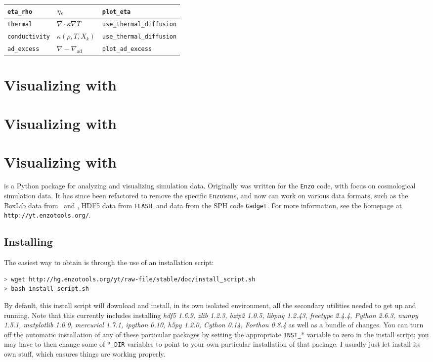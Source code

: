 \begin{center}
\begin{longtable}{|l|p{2.25in}|p{2.5in}|}
\hline
{\tt eta\_rho}         & $\eta_{\rho}$ & {\tt plot\_eta} \\
\hline
{\tt thermal}          & $\nabla \cdot \kappa \nabla T$ & {\tt use\_thermal\_diffusion} \\
\hline
{\tt conductivity}     & $\kappa(\rho, T, X_k)$ & {\tt use\_thermal\_diffusion} \\
\hline
{\tt ad\_excess}       & $\nabla - \nabla_\mathrm{ad}$ & {\tt plot\_ad\_excess} \\
\hline
\end{longtable}
\end{center}

\renewcommand{\arraystretch}{1.0}

\section{Visualizing with \amrvis}


\section{Visualizing with \visit}


\section{Visualizing with \yt}
\yt is a Python package for analyzing and visualizing simulation data.
Originally \yt was written for the {\tt Enzo} code, with focus on
cosmological simulation data.  It has since been refactored to remove
the specific {\tt Enzo}isms, and now can work on various data formats,
such as the BoxLib data from \maestro\ and \castro, HDF5 data
from {\tt FLASH}, and data from the SPH code {\tt Gadget}.  For more
information, see the \yt homepage at {\tt http://yt.enzotools.org/}.

\subsection{Installing \yt}
The easiest way to obtain \yt is through the use of an installation script:
\begin{lstlisting}[language=bash,mathescape=false]
> wget http://hg.enzotools.org/yt/raw-file/stable/doc/install_script.sh
> bash install_script.sh
\end{lstlisting}
By default, this \yt install script will download and install, in its
own isolated environment, all the secondary utilities needed to get \yt
up and running.  Note that this currently includes installing {\it
  hdf5 1.6.9, zlib 1.2.3, bzip2 1.0.5, libpng 1.2.43, freetype 2.4.4,
  Python 2.6.3, numpy 1.5.1, matplotlib 1.0.0, mercurial 1.7.1,
  ipython 0.10, h5py 1.2.0, Cython 0.14, Forthon 0.8.4} as well as a
 bundle of changes.  You can turn off the automatic
installation of any of these particular packages by setting the
appropriate {\tt INST\_}* variable to zero in the install script;
you may have to then change some of *{\tt \_DIR} variables to point to
your own particular installation of that package.  I usually just let
\yt install its own stuff, which ensures things are working properly.

